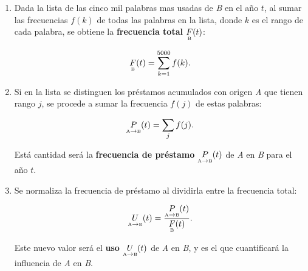 \begin{enumerate}
	\label{proceso_uso}
	
	\item  Dada la lista de las cinco mil palabras mas usadas de \textit{B} en el año $t$, al sumar las frecuencias $f(k)$ de 
	todas las palabras en la lista, donde $k$ es el rango  de cada palabra, se obtiene la \textbf{frecuencia total} $\underset{\text{\tiny B}}{F}(t)$:
	
	\begin{equation}
	\label{ec.ftot}
	\underset{\text{\tiny B}}{F}(t) = \sum_{k=1}^{5000} f(k).
	\end{equation}
	 
	
	\item Si en la lista se distinguen los préstamos acumulados con origen \textit{A}  que tienen rango $j$,  se procede a sumar la frecuencia $f(j)$ de estas palabras:
	
	\begin{equation}
	\label{ec.fpres}
	\underset{ \text{\tiny A} \to  \text{\tiny B} }{P}(t) = \sum_{j} f(j).
	\end{equation}
	
	Está cantidad será la  \textbf{frecuencia de préstamo} $\underset{ \text{\tiny A} \to  \text{\tiny B} }{P}(t)$   de \textit{A} en \textit{B} para el año $t$.
	
	\item Se normaliza la frecuencia de préstamo al dividirla entre la frecuencia total:
	
	
	\begin{equation}
	\label{ec.fuso}
	\underset{ \text{\tiny A} \to  \text{\tiny B} }{U}(t) = \frac{	\underset{ \text{\tiny A} \to  \text{\tiny B} }{P}(t)}{\underset{\text{\tiny B}}{F}(t) }.
	\end{equation}	
	
	Este nuevo valor será el \textbf{uso} $\underset{ \text{\tiny A} \to  \text{\tiny B} }{U}(t)$  de \textit{A} en \textit{B}, y es el que cuantificará la influencia de \textit{A} en \textit{B}. 
	
	
\end{enumerate}

